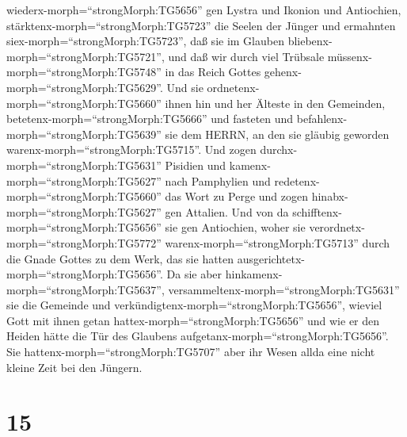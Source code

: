 wiederx-morph=``strongMorph:TG5656'' gen Lystra und Ikonion und
Antiochien,  stärktenx-morph=``strongMorph:TG5723'' die
Seelen der Jünger und ermahnten siex-morph=``strongMorph:TG5723'', daß
sie im Glauben bliebenx-morph=``strongMorph:TG5721'', und daß wir durch
viel Trübsale müssenx-morph=``strongMorph:TG5748'' in das Reich Gottes
gehenx-morph=``strongMorph:TG5629''.  Und sie
ordnetenx-morph=``strongMorph:TG5660'' ihnen hin und her Älteste in den
Gemeinden, betetenx-morph=``strongMorph:TG5666'' und fasteten und
befahlenx-morph=``strongMorph:TG5639'' sie dem HERRN, an den sie gläubig
geworden warenx-morph=``strongMorph:TG5715''.  Und zogen
durchx-morph=``strongMorph:TG5631'' Pisidien und
kamenx-morph=``strongMorph:TG5627'' nach Pamphylien  und
redetenx-morph=``strongMorph:TG5660'' das Wort zu Perge und zogen
hinabx-morph=``strongMorph:TG5627'' gen Attalien.  Und von
da schifftenx-morph=``strongMorph:TG5656'' sie gen Antiochien, woher sie
verordnetx-morph=``strongMorph:TG5772''
warenx-morph=``strongMorph:TG5713'' durch die Gnade Gottes zu dem Werk,
das sie hatten ausgerichtetx-morph=``strongMorph:TG5656''. 
Da sie aber hinkamenx-morph=``strongMorph:TG5637'',
versammeltenx-morph=``strongMorph:TG5631'' sie die Gemeinde und
verkündigtenx-morph=``strongMorph:TG5656'', wieviel Gott mit ihnen getan
hattex-morph=``strongMorph:TG5656'' und wie er den Heiden hätte die Tür
des Glaubens aufgetanx-morph=``strongMorph:TG5656''.  Sie
hattenx-morph=``strongMorph:TG5707'' aber ihr Wesen allda eine nicht
kleine Zeit bei den Jüngern.

\hypertarget{section-14}{%
\section{15}\label{section-14}}

